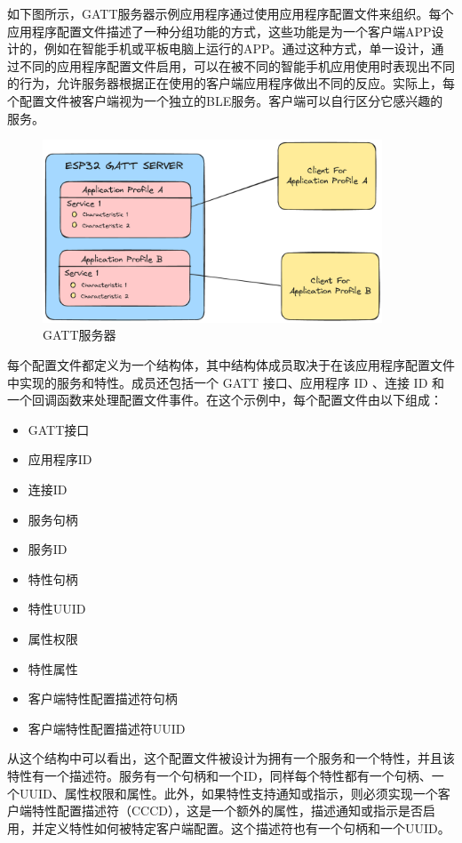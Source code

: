 \documentclass[lang=cn,newtx,10pt,scheme=chinese]{elegantbook}
\begin{document}
如下图所示，GATT服务器示例应用程序通过使用应用程序配置文件来组织。每个应用程序配置文件描述了一种分组功能的方式，这些功能是为一个客户端APP设计的，例如在智能手机或平板电脑上运行的APP。通过这种方式，单一设计，通过不同的应用程序配置文件启用，可以在被不同的智能手机应用使用时表现出不同的行为，允许服务器根据正在使用的客户端应用程序做出不同的反应。实际上，每个配置文件被客户端视为一个独立的BLE服务。客户端可以自行区分它感兴趣的服务。

\begin{figure}[!htb]
\centering
\includegraphics[width=0.9\textwidth]{figures/GATT_SERVER_1.pdf}
\caption{GATT服务器}
\end{figure}

每个配置文件都定义为一个结构体，其中结构体成员取决于在该应用程序配置文件中实现的服务和特性。成员还包括一个 GATT 接口、应用程序 ID 、连接 ID 和一个回调函数来处理配置文件事件。在这个示例中，每个配置文件由以下组成：

\begin{itemize}
\item GATT接口
\item 应用程序ID
\item 连接ID
\item 服务句柄
\item 服务ID
\item 特性句柄
\item 特性UUID
\item 属性权限
\item 特性属性
\item 客户端特性配置描述符句柄
\item 客户端特性配置描述符UUID
\end{itemize}

从这个结构中可以看出，这个配置文件被设计为拥有一个服务和一个特性，并且该特性有一个描述符。服务有一个句柄和一个ID，同样每个特性都有一个句柄、一个UUID、属性权限和属性。此外，如果特性支持通知或指示，则必须实现一个客户端特性配置描述符（CCCD），这是一个额外的属性，描述通知或指示是否启用，并定义特性如何被特定客户端配置。这个描述符也有一个句柄和一个UUID。
\end{document}
